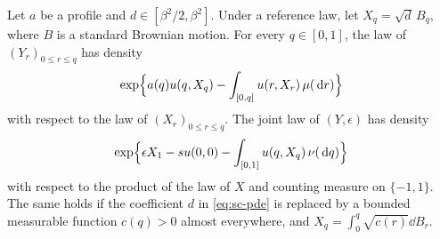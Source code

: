 \begin{lemma}\label{lem:sc-likelihood}
Let $a$ be a profile and $d\in[\beta^2/2,\beta^2]$. Under a reference
law, let $X_q=\sqrt d\,B_q$, where $B$ is a standard Brownian motion.
For every $q\in[0,1]$, the law of $(Y_r)_{0\le r\le q}$ has density
\begin{equation}\label{eq:sc-prefix-law}
 \exp\Bigl\{a(q)u(q,X_q)-\int_{[0,q]}u(r,X_r)\,\mu(\,\mathrm d r)\Bigr\}
\end{equation}
with respect to the law of $(X_r)_{0\le r\le q}$. The joint law of
$(Y,\epsilon)$ has density
\begin{equation}\label{eq:sc-joint-law}
 \exp\Bigl\{\epsilon X_1-su(0,0)-\int_{[0,1]}u(q,X_q)\,\nu(\,\mathrm d q)\Bigr\}
\end{equation}
with respect to the product of the law of $X$ and counting measure on
$\{-1,1\}$. The same holds if the coefficient $d$ in \eqref{eq:sc-pde}
is replaced by a bounded measurable function $c(q)>0$ almost
everywhere, and $X_q=\int_0^q\sqrt{c(r)}\dd B_r$.
\end{lemma}


